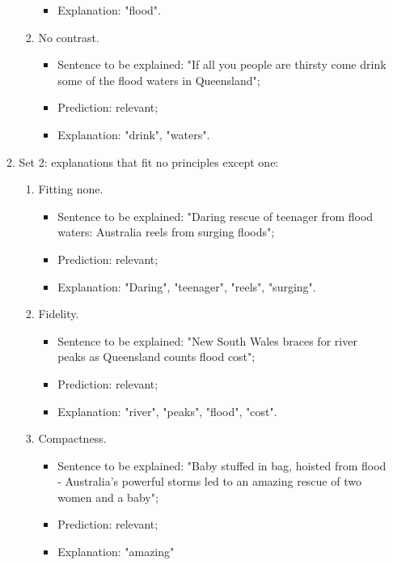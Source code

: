 \begin{enumerate}
\begin{enumerate}
\begin{enumerate}
\begin{itemize}
                \item Explanation: "flood".
            \end{itemize}
            \item No contrast. \begin{itemize}
                \item Sentence to be explained: "If all you people are thirsty come drink some of the flood waters in Queensland";
                \item Prediction: relevant;
                \item Explanation: "drink", "waters".
            \end{itemize}
        \end{enumerate}
        
        \item Set 2: explanations that fit no principles except one: \begin{enumerate}
            \item Fitting none. \begin{itemize}
                \item Sentence to be explained: "Daring rescue of teenager from flood waters: Australia reels from surging floods";
                \item Prediction: relevant;
                \item Explanation: "Daring", "teenager", "reels", "surging".
            \end{itemize}
            \item Fidelity. \begin{itemize}
                \item Sentence to be explained: "New South Wales braces for river peaks as Queensland counts flood cost";
                \item Prediction: relevant;
                \item Explanation: "river", "peaks", "flood", "cost".
            \end{itemize}
            \item Compactness. \begin{itemize}
                \item Sentence to be explained: "Baby stuffed in bag, hoisted from flood - Australia's powerful storms led to an amazing rescue of two women and a baby";
                \item Prediction: relevant;
                \item Explanation: "amazing"
            \end{itemize}

\end{enumerate}
\end{enumerate}
\end{enumerate}
